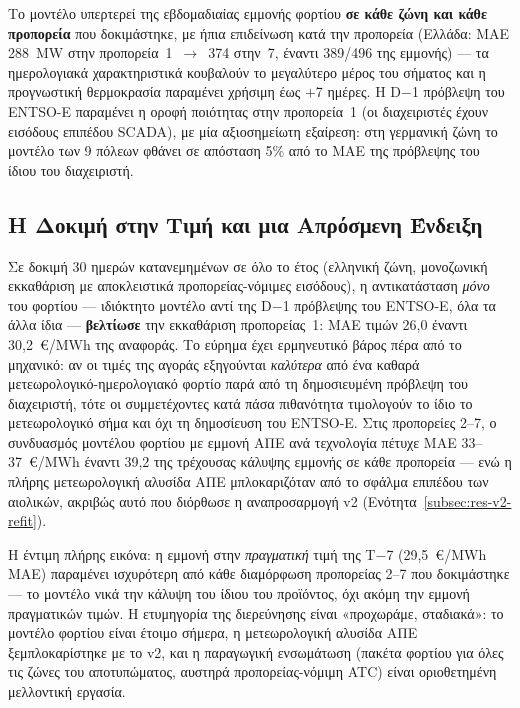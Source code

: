 Το μοντέλο υπερτερεί της εβδομαδιαίας εμμονής φορτίου \textbf{σε κάθε ζώνη και κάθε προπορεία} που δοκιμάστηκε, με ήπια επιδείνωση κατά την προπορεία (Ελλάδα: MAE 288~MW στην προπορεία~1~$\to$~374 στην~7, έναντι 389/496 της εμμονής) --- τα ημερολογιακά χαρακτηριστικά κουβαλούν το μεγαλύτερο μέρος του σήματος και η προγνωστική θερμοκρασία παραμένει χρήσιμη έως $+$7 ημέρες. Η D$-$1 πρόβλεψη του ENTSO-E παραμένει η οροφή ποιότητας στην προπορεία~1 (οι διαχειριστές έχουν εισόδους επιπέδου SCADA), με μία αξιοσημείωτη εξαίρεση: στη γερμανική ζώνη το μοντέλο των 9 πόλεων φθάνει σε απόσταση 5\% από το MAE της πρόβλεψης του ίδιου του διαχειριστή.

\subsection{Η Δοκιμή στην Τιμή και μια Απρόσμενη Ένδειξη}
\label{subsec:load-price-test}

Σε δοκιμή 30 ημερών κατανεμημένων σε όλο το έτος (ελληνική ζώνη, μονοζωνική εκκαθάριση με αποκλειστικά προπορείας-νόμιμες εισόδους), η αντικατάσταση \emph{μόνο} του φορτίου --- ιδιόκτητο μοντέλο αντί της D$-$1 πρόβλεψης του ENTSO-E, όλα τα άλλα ίδια --- \textbf{βελτίωσε} την εκκαθάριση προπορείας~1: MAE τιμών 26,0 έναντι 30,2~€/MWh της αναφοράς. Το εύρημα έχει ερμηνευτικό βάρος πέρα από το μηχανικό: αν οι τιμές της αγοράς εξηγούνται \emph{καλύτερα} από ένα καθαρά μετεωρολογικό-ημερολογιακό φορτίο παρά από τη δημοσιευμένη πρόβλεψη του διαχειριστή, τότε οι συμμετέχοντες κατά πάσα πιθανότητα τιμολογούν το ίδιο το μετεωρολογικό σήμα και όχι τη δημοσίευση του ENTSO-E. Στις προπορείες 2--7, ο συνδυασμός μοντέλου φορτίου με εμμονή ΑΠΕ ανά τεχνολογία πέτυχε MAE 33--37~€/MWh έναντι 39,2 της τρέχουσας κάλυψης εμμονής σε κάθε προπορεία --- ενώ η πλήρης μετεωρολογική αλυσίδα ΑΠΕ μπλοκαριζόταν από το σφάλμα επιπέδου των αιολικών, ακριβώς αυτό που διόρθωσε η αναπροσαρμογή v2 (Ενότητα~\ref{subsec:res-v2-refit}).

Η έντιμη πλήρης εικόνα: η εμμονή στην \emph{πραγματική} τιμή της T$-$7 (29,5~€/MWh MAE) παραμένει ισχυρότερη από κάθε διαμόρφωση προπορείας 2--7 που δοκιμάστηκε --- το μοντέλο νικά την κάλυψη του ίδιου του προϊόντος, όχι ακόμη την εμμονή πραγματικών τιμών. Η ετυμηγορία της διερεύνησης είναι «προχωράμε, σταδιακά»: το μοντέλο φορτίου είναι έτοιμο σήμερα, η μετεωρολογική αλυσίδα ΑΠΕ ξεμπλοκαρίστηκε με το v2, και η παραγωγική ενσωμάτωση (πακέτα φορτίου για όλες τις ζώνες του αποτυπώματος, αυστηρά προπορείας-νόμιμη ATC) είναι οριοθετημένη μελλοντική εργασία.


